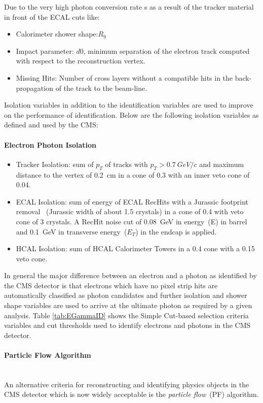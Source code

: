 Due to the very high photon conversion rate s as a result of the tracker material in front of the ECAL  cuts like: 
\begin{itemize}
\item  Calorimeter shower shape:$R_{9}$
\item Impact parameter: $d0$, minimum separation of the electron track computed with respect to the  reconstruction vertex.
\item Missing Hits: Number of cross layers  without a compatible hits in the back-propagation of the track to the beam-line.
\end{itemize}
 Isolation variables in addition to the identification variables are used to improve on the performance of identification. Below are the following isolation variables as defined and used by the CMS:
\paragraph*{ Electron Photon Isolation} 
 \begin{itemize}
 \item Tracker Isolation: sum of $p_{T}$ of tracks  with $p_{T} > 0.7~GeV/c$ and maximum distance to the vertex  of 0.2~cm in  a cone of 0.3 with an inner veto cone of 0.04.
 \item ECAL Isolation: sum of energy  of ECAL RecHits with a Jurassic footprint removal ~(Jurassic width of about 1.5 crystals) in a cone  of 0.4  with veto cone of 3 crystals. A RecHit noise cut of 0.08~GeV in energy~(E) in barrel and 0.1~GeV in transverse energy~($E_{T}$) in the endcap is applied.
 \item HCAL Isolation: sum of HCAL Calorimeter Towers in a 0.4 cone with a 0.15 veto cone.
 \end{itemize}
In general the major difference between an electron and a photon as identified by the CMS detector is that electrons which have no pixel strip hits are automatically  classified as photon candidates and further isolation and shower shape variables are used to arrive at the ultimate photon as required by a given analysis.
 Table \ref{tab:EGammaID} shows the Simple Cut-based selection criteria variables and cut thresholds used to identify electrons and photons in the CMS detector.

\paragraph*{Particle Flow Algorithm} \mbox{}\\
An alternative criteria for reconstructing and identifying physics objects in the CMS detector which is now widely acceptable is the \textit{particle flow}~(PF) algorithm.


